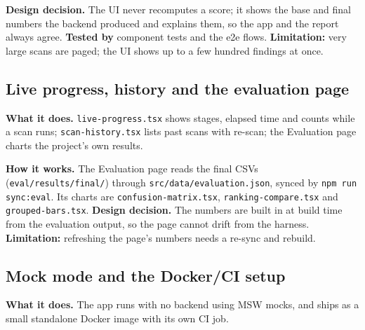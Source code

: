 \begin{center}
\end{center}

\textbf{Design decision.} The UI never recomputes a score; it shows the base and
final numbers the backend produced and explains them, so the app and the report
always agree. \textbf{Tested by} component tests and the e2e flows.
\textbf{Limitation:} very large scans are paged; the UI shows up to a few hundred
findings at once.

\subsection{Live progress, history and the evaluation page}
\textbf{What it does.} \texttt{live-progress.tsx} shows stages, elapsed time and
counts while a scan runs; \texttt{scan-history.tsx} lists past scans with
re-scan; the Evaluation page charts the project's own results.

\textbf{How it works.} The Evaluation page reads the final CSVs
(\texttt{eval/results/final/}) through \texttt{src/data/evaluation.json}, synced
by \texttt{npm run sync:eval}. Its charts are \texttt{confusion-matrix.tsx},
\texttt{ranking-compare.tsx} and \texttt{grouped-bars.tsx}.
\textbf{Design decision.} The numbers are built in at build time from the
evaluation output, so the page cannot drift from the harness.
\textbf{Limitation:} refreshing the page's numbers needs a re-sync and rebuild.

\subsection{Mock mode and the Docker/CI setup}
\textbf{What it does.} The app runs with no backend using MSW mocks, and ships as
a small standalone Docker image with its own CI job.

